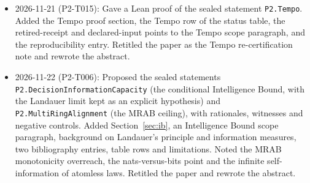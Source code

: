 \documentclass[11pt]{article}
\theoremstyle{definition}
\theoremstyle{remark}
\begin{document}
\begin{itemize}
Added the Tempo section, a Tempo scope paragraph, a limitations note on the deposit's provenance, and a bibliography entry.
Retitled the paper and updated the abstract, introduction, background and tables.
\item 2026-11-21 (P2-T015): Gave a Lean proof of the sealed statement \texttt{P2.Tempo}. Added the Tempo proof section, the Tempo
row of the status table, the retired-receipt and declared-input points to the Tempo scope paragraph, and the reproducibility entry.
Retitled the paper as the Tempo re-certification note and rewrote the abstract.
\item 2026-11-22 (P2-T006): Proposed the sealed statements \texttt{P2.DecisionInformationCapacity} (the conditional Intelligence
Bound, with the Landauer limit kept as an explicit hypothesis) and \texttt{P2.MultiRingAlignment} (the MRAB ceiling), with rationales,
witnesses and negative controls. Added Section~\ref{sec:ib}, an Intelligence Bound scope paragraph, background on Landauer's
principle and information measures, two bibliography entries, table rows and limitations. Noted the MRAB monotonicity overreach,
the nats-versus-bits point and the infinite self-information of atomless laws. Retitled the paper and rewrote the abstract.
\end{itemize}



\end{document}
